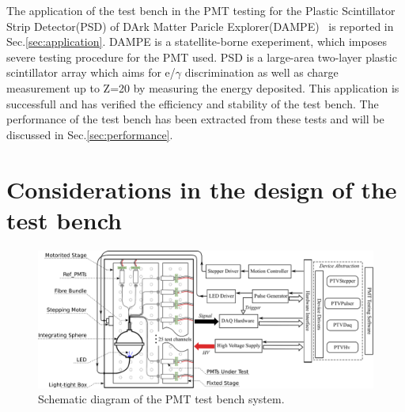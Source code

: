 \documentclass[5p, times]{elsarticle}
\begin{document}
The application of the test bench in the PMT testing for the Plastic Scintillator Strip Detector(PSD) of DArk Matter Paricle Explorer(DAMPE)~\cite{Chang_Jin_dampe} is reported in Sec.\ref{sec:application}.
DAMPE is a statellite-borne  exeperiment, which imposes severe testing procedure for the PMT used.
PSD is a large-area two-layer plastic scintillator array which aims for  e/$\gamma$ discrimination as well as charge measurement up to Z=20 by measuring the energy deposited.
This application is successfull and has verified the efficiency and stability of the test bench.
The performance of the test bench has been extracted from these tests and will be discussed in Sec.\ref{sec:performance}.

\section{Considerations in the design of the test bench}
\label{sec:design_consideration}
\begin{figure}
 \centering
 \includegraphics[width=160mm]{testbench_overview}
\caption{Schematic diagram of the PMT test bench system.}
\label{fig:testbench_overveiw}
\end{figure}
\end{document}
